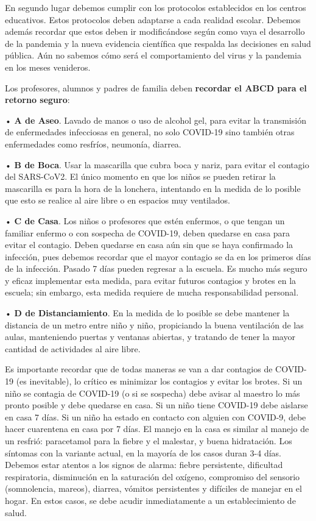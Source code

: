 \documentclass[12pt,a4paper,openany]{book}
\begin{document}
En segundo lugar debemos cumplir con los protocolos establecidos en los centros educativos. Estos protocolos deben adaptarse  a cada realidad escolar. Debemos además recordar que estos deben ir modificándose según como vaya el desarrollo de la pandemia y la nueva evidencia científica que respalda las decisiones en salud pública. Aún no sabemos cómo será el comportamiento del virus y la pandemia en los meses venideros.

Los profesores, alumnos y padres de familia deben \textbf{recordar el ABCD para el retorno seguro}: 


•	\textbf{A de Aseo}. Lavado de manos o uso de alcohol gel, para evitar la transmisión de enfermedades infecciosas en general, no solo COVID-19 sino también otras enfermedades como resfríos, neumonía, diarrea.


•	\textbf{B de Boca}. Usar la mascarilla que cubra boca y nariz, para evitar el contagio del SARS-CoV2. El único momento en que los niños se pueden retirar la mascarilla es para la hora de la  lonchera,  intentando en la medida de lo posible que esto se realice al aire libre o en espacios muy ventilados. 


•\textbf{	C de Casa}. Los niños o profesores que estén enfermos, o que tengan un familiar enfermo o con sospecha de COVID-19, deben quedarse en casa para evitar el contagio. Deben quedarse en casa aún sin que se haya confirmado la infección, pues debemos recordar que el mayor contagio se da en los primeros días de la infección. Pasado 7 días pueden regresar a la escuela. Es mucho más seguro y eficaz implementar  esta medida, para evitar futuros  contagios y brotes en la escuela; sin embargo, esta medida requiere de mucha responsabilidad personal. 


•\textbf{	D de Distanciamiento}.  En la medida de lo posible se debe mantener la distancia de un metro entre niño y niño, propiciando la buena ventilación de las aulas, manteniendo puertas y ventanas abiertas, y tratando de tener la mayor cantidad de actividades al aire libre.  

Es importante recordar que de todas maneras se van a dar contagios de COVID-19 (es inevitable),  lo crítico es minimizar los contagios y evitar los  brotes. Si un niño se contagia de COVID-19 (o si se sospecha) debe avisar al  maestro lo más pronto posible y debe quedarse en casa. Si un niño tiene COVID-19 debe aislarse en casa 7 días. Si un niño ha estado en contacto con alguien con COVID-9, debe hacer cuarentena en casa por 7 días. El manejo en la casa es similar al manejo de un resfrió: paracetamol para la fiebre y el malestar, y buena hidratación. Los síntomas con la variante actual, en la mayoría de los casos duran 3-4 días. Debemos estar atentos a los signos de alarma: fiebre persistente, dificultad respiratoria, disminución en la saturación del oxígeno, compromiso del sensorio (somnolencia, mareos), diarrea, vómitos persistentes y difíciles de manejar en el hogar. En estos casos, se debe acudir inmediatamente a un establecimiento de salud.
\end{document}
